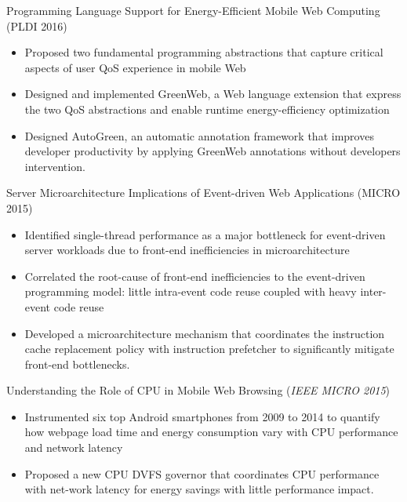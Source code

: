 \documentclass[margin, 9pt]{res} %
\begin{document}
\begin{resume}
\vspace*{-7pt}
Programming Language Support for Energy-Efficient Mobile Web Computing \hfill(PLDI 2016)\\
\vspace*{-10pt}
\begin{itemize}[leftmargin=*] \itemsep -3pt
\vspace*{-5pt}
	\item Proposed two fundamental programming abstractions that capture critical aspects of user QoS experience in mobile Web
	\item Designed and implemented GreenWeb, a Web language extension that express the two QoS abstractions and enable runtime energy-efficiency optimization
	\item Designed AutoGreen, an automatic annotation framework that improves developer productivity by applying GreenWeb annotations without developers intervention.
\end{itemize}

\medskip
Server Microarchitecture Implications of Event-driven Web Applications \hfill(MICRO 2015)\\
\vspace*{-10pt}
\begin{itemize}[leftmargin=*] \itemsep -3pt
\vspace*{-5pt}
	\item Identified single-thread performance as a major bottleneck for event-driven server workloads due to front-end inefficiencies in microarchitecture
	\item Correlated the root-cause of front-end inefficiencies to the event-driven programming model: little intra-event code reuse coupled with heavy inter-event code reuse
	\item Developed a microarchitecture mechanism that coordinates the instruction cache replacement policy with instruction prefetcher to significantly mitigate front-end bottlenecks.
\end{itemize}

\medskip
Understanding the Role of CPU in Mobile Web Browsing \hfill(\textit{IEEE MICRO 2015})\\
\vspace*{-10pt}
\begin{itemize}[leftmargin=*] \itemsep -3pt
\vspace*{-5pt}
	\item Instrumented six top Android smartphones from 2009 to 2014 to quantify how webpage load time and energy consumption vary with CPU performance and network latency
	\item Proposed a new CPU DVFS governor that coordinates CPU performance with net-work latency for energy savings with little performance impact.
\end{itemize}


\end{resume}
\end{document}
